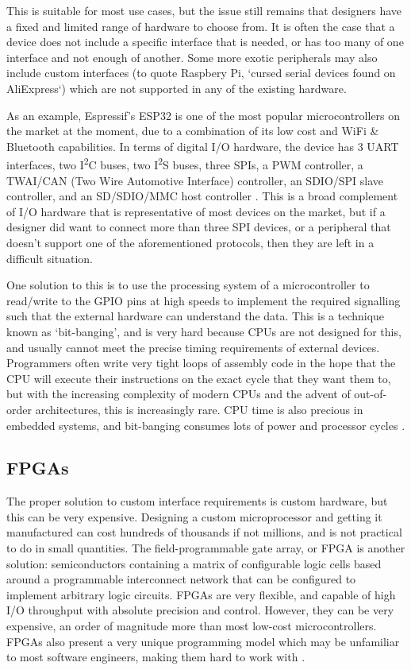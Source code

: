 This is suitable for most use cases, but the issue still remains that designers have a fixed and limited range of hardware to choose from. It is often the case that a device does not include a specific interface that is needed, or has too many of one interface and not enough of another. Some more exotic peripherals may also include custom interfaces (to quote Raspbery Pi, `cursed serial devices found on AliExpress`) which are not supported in any of the existing hardware.

As an example, Espressif's ESP32 is one of the most popular microcontrollers on the market at the moment, due to a combination of its low cost and WiFi \& Bluetooth capabilities. In terms of digital I/O hardware, the device has 3 UART interfaces, two I\textsuperscript{2}C buses, two I\textsuperscript{2}S buses, three SPIs, a PWM controller, a TWAI/CAN (Two Wire Automotive Interface) controller, an SDIO/SPI slave controller, and an SD/SDIO/MMC host controller \cite{esp32}. This is a broad complement of I/O hardware that is representative of most devices on the market, but if a designer did want to connect more than three SPI devices, or a peripheral that doesn't support one of the aforementioned protocols, then they are left in a difficult situation.

One solution to this is to use the processing system of a microcontroller to read/write to the GPIO pins at high speeds to implement the required signalling such that the external hardware can understand the data. This is a technique known as `bit-banging', and is very hard because CPUs are not designed for this, and usually cannot meet the precise timing requirements of external devices. Programmers often write very tight loops of assembly code in the hope that the CPU will execute their instructions on the exact cycle that they want them to, but with the increasing complexity of modern CPUs and the advent of out-of-order architectures, this is increasingly rare. CPU time is also precious in embedded systems, and bit-banging consumes lots of power and processor cycles \cite{bitbang}.

\subsection{FPGAs}

The proper solution to custom interface requirements is custom hardware, but this can be very expensive. Designing a custom microprocessor and getting it manufactured can cost hundreds of thousands if not millions, and is not practical to do in small quantities. The field-programmable gate array, or FPGA is another solution: semiconductors containing a matrix of configurable logic cells based around a programmable interconnect network that can be configured to implement arbitrary logic circuits. FPGAs are very flexible, and capable of high I/O throughput with absolute precision and control. However, they can be very expensive, an order of magnitude more than most low-cost microcontrollers. FPGAs also present a very unique programming model which may be unfamiliar to most software engineers, making them hard to work with \cite{whatisfpga}.

